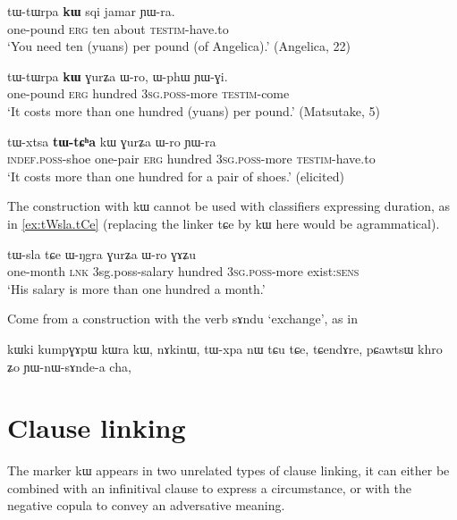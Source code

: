\documentclass[oldfontcommands,oneside,a4paper,11pt]{article}
\newcommand{\ipa}[1]{{\phon #1}} %
\begin{document}
 \begin{exe} 
\ex \label{ex:tWtWrpa.kW1}
\gll  
\ipa{tɯ-tɯrpa} 	\ipa{\textbf{kɯ}} 	\ipa{sqi} 	\ipa{jamar} 	\ipa{ɲɯ-ra.} 	\\
one-pound \textsc{erg} ten about \textsc{testim}-have.to \\
\glt `You need ten (yuans) per pound (of Angelica).' (Angelica, 22)
\end{exe}  

 \begin{exe} 
\ex \label{ex:tWtWrpa.kW2}
\gll  
\ipa{tɯ-tɯrpa}  	\ipa{\textbf{kɯ}}  	\ipa{ɣurʑa}  	\ipa{ɯ-ro,}  	\ipa{ɯ-phɯ}  	\ipa{ɲɯ-ɣi.}  \\
one-pound \textsc{erg} hundred \textsc{3sg.poss}-more \textsc{testim}-come \\
\glt `It costs more than one hundred (yuans) per pound.' (Matsutake, 5)
\end{exe}  
  \begin{exe} 
\ex \label{ex:tWtCha.kW}
\gll  
\ipa{tɯ-xtsa} 	\ipa{\textbf{tɯ-tɕʰa}} 	\ipa{kɯ} 	\ipa{ɣurʑa} 	\ipa{ɯ-ro} 	\ipa{ɲɯ-ra} \\
\textsc{indef.poss}-shoe one-pair \textsc{erg} hundred \textsc{3sg.poss}-more \textsc{testim}-have.to \\
 \glt  `It costs more than one hundred for a pair of shoes.' (elicited)
\end{exe}  
The construction with \ipa{kɯ} cannot be used with classifiers expressing duration, as in \ref{ex:tWsla.tCe} (replacing the linker \ipa{tɕe} by \ipa{kɯ} here would be agrammatical).
 
 \begin{exe} 
\ex \label{ex:tWsla.tCe}
\gll  
  \ipa{tɯ-sla} \ipa{tɕe} \ipa{ɯ-ŋgra} \ipa{ɣurʑa} \ipa{ɯ-ro} \ipa{ɣɤʑu} \\
  one-month \textsc{lnk} 3sg.poss-salary hundred \textsc{3sg.poss}-more exist:\textsc{sens} \\
  \glt `His salary is more than one hundred a month.'
  \end{exe}  
  
  Come from a construction with the verb \ipa{sɤndu} `exchange', as in
  
  
  kɯki kumpɣɤpɯ kɯra kɯ, nɤkinɯ,
tɯ-xpa nɯ tɕu tɕe, tɕendɤre,
pɕawtsɯ khro ʑo ɲɯ-nɯ-sɤnde-a cha,
  
 \section{Clause linking} \label{sec:linking}
 The marker \ipa{kɯ} appears in two unrelated types of clause linking, it can either be combined with an infinitival clause to express a circumstance, or with the negative copula to convey an adversative meaning.
 
\end{document}
